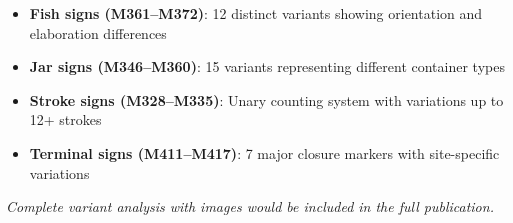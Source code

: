 \begin{itemize}
    \item \textbf{Fish signs (M361--M372)}: 12 distinct variants showing orientation and elaboration differences
    \item \textbf{Jar signs (M346--M360)}: 15 variants representing different container types
    \item \textbf{Stroke signs (M328--M335)}: Unary counting system with variations up to 12+ strokes
    \item \textbf{Terminal signs (M411--M417)}: 7 major closure markers with site-specific variations
\end{itemize}

\textit{Complete variant analysis with images would be included in the full publication.}

